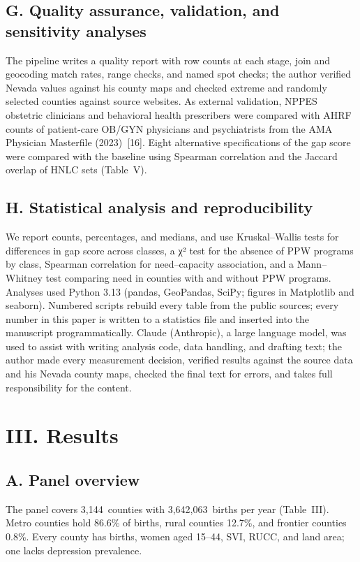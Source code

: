 \documentclass{article}
\begin{document}
\subsection*{G. Quality assurance, validation, and sensitivity analyses}
The pipeline writes a quality report with row counts at each stage, join and geocoding match rates, range checks, and named spot checks; the author verified Nevada values against his county maps and checked extreme and randomly selected counties against source websites. As external validation, NPPES obstetric clinicians and behavioral health prescribers were compared with AHRF counts of patient-care OB/GYN physicians and psychiatrists from the AMA Physician Masterfile (2023)~[16]. Eight alternative specifications of the gap score were compared with the baseline using Spearman correlation and the Jaccard overlap of HNLC sets (Table~V).

\subsection*{H. Statistical analysis and reproducibility}
We report counts, percentages, and medians, and use Kruskal--Wallis tests for differences in gap score across classes, a χ² test for the absence of PPW programs by class, Spearman correlation for need--capacity association, and a Mann--Whitney test comparing need in counties with and without PPW programs. Analyses used Python 3.13 (pandas, GeoPandas, SciPy; figures in Matplotlib and seaborn). Numbered scripts rebuild every table from the public sources; every number in this paper is written to a statistics file and inserted into the manuscript programmatically. Claude (Anthropic), a large language model, was used to assist with writing analysis code, data handling, and drafting text; the author made every measurement decision, verified results against the source data and his Nevada county maps, checked the final text for errors, and takes full responsibility for the content.

\section*{III. Results}

\subsection*{A. Panel overview}
The panel covers 3,144\ counties with 3,642,063\ births per year (Table~III). Metro counties hold 86.6\% of births, rural counties 12.7\%, and frontier counties 0.8\%. Every county has births, women aged 15--44, SVI, RUCC, and land area; one lacks depression prevalence.
\end{document}
